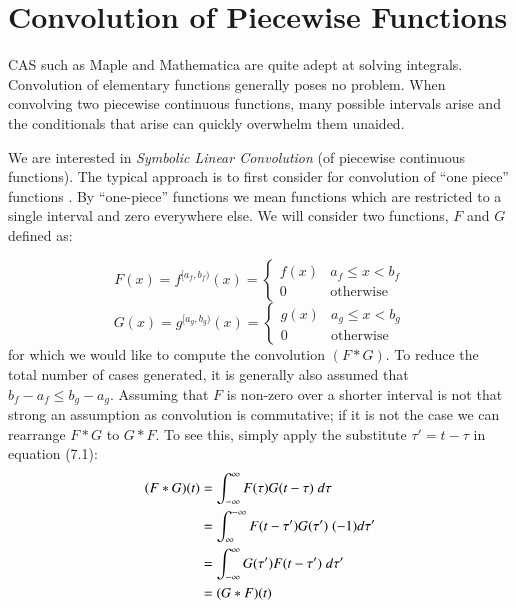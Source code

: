 \section{Convolution of Piecewise Functions}\label{sec:PWConvolution}


CAS such as Maple and Mathematica are quite adept at solving integrals.
Convolution of elementary functions generally poses no problem.
When convolving two piecewise continuous functions, many possible intervals arise and the conditionals that arise
can quickly overwhelm them unaided. 


We are interested in \emph{Symbolic Linear Convolution} (of piecewise continuous functions).
The typical approach is to first consider for convolution of ``one piece'' functions 
\cite{evans1994algorithms, west1993symbolic}.
By ``one-piece'' functions we mean functions which are restricted to a single interval and zero everywhere else.
We will consider two functions, $F$ and $G$ defined as:


\begin{equation}
	\label{eqn:fOnePiece}
	F(x)=f^{[a_f,b_f)}(x) = 
		\begin{cases}
			f(x) & a_f \leq x < b_f \\
			0 & \text{otherwise}
		\end{cases}
\end{equation}
\begin{equation}
	\label{eqn:gOnePiece}
	G(x)=g^{[a_g,b_g)}(x) = 
		\begin{cases}
			g(x) & a_g \leq x < b_g \\
			0 & \text{otherwise}
		\end{cases}
\end{equation}
for which we would like to compute the convolution $(F*G)$.
To reduce the total number of cases generated, it is generally also assumed that $b_f - a_f \leq b_g - a_g$.
Assuming that $F$ is non-zero over a shorter interval is not that strong an assumption as convolution is commutative;
if it is not the case we can rearrange $F*G$ to $G*F$.
To see this, simply apply the substitute $\tau' = t-\tau$ in equation (7.1):
\begin{align}
	\label{eqn:ConvCommutative}
	(F*G)(t) 
		&= \int_{-\infty}^\infty F(\tau) G(t-\tau) \;d \tau 
		\notag\\&= \int_{\infty}^{-\infty} F(t-\tau')G(\tau')\; (-1) d\tau' 
		\notag\\&= \int_{-\infty}^\infty G(\tau') F(t-\tau') \; d\tau'
		\notag\\&= (G*F)(t)
\end{align}


